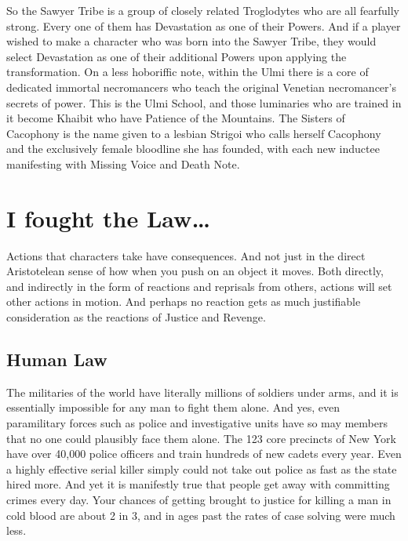So the Sawyer Tribe is a group of closely related Troglodytes who are all fearfully strong. Every one of them has Devastation as one of their Powers. And if a player wished to make a character who was born into the Sawyer Tribe, they would select Devastation as one of their additional Powers upon applying the transformation. On a less hoboriffic note, within the Ulmi there is a core of dedicated immortal necromancers who teach the original Venetian necromancer's secrets of power. This is the Ulmi School, and those luminaries who are trained in it become Khaibit who have Patience of the Mountains. The Sisters of Cacophony is the name given to a lesbian Strigoi who calls herself Cacophony and the exclusively female bloodline she has founded, with each new inductee manifesting with Missing Voice and Death Note.

\section{I fought the Law\ldots{}}

Actions that characters take have consequences. And not just in the direct Aristotelean sense of how when you push on an object it moves. Both directly, and indirectly in the form of reactions and reprisals from others, actions will set other actions in motion. And perhaps no reaction gets as much justifiable consideration as the reactions of Justice and Revenge.

\subsection{Human Law}

\hspace{\parindent} The militaries of the world have literally millions of soldiers under arms, and it is essentially impossible for any man to fight them alone. And yes, even paramilitary forces such as police and investigative units have so may members that no one could plausibly face them alone. The 123 core precincts of New York have over 40,000 police officers and train hundreds of new cadets every year. Even a highly effective serial killer simply could not take out police as fast as the state hired more. And yet it is manifestly true that people get away with committing crimes every day. Your chances of getting brought to justice for killing a man in cold blood are about 2 in 3, and in ages past the rates of case solving were much less.

